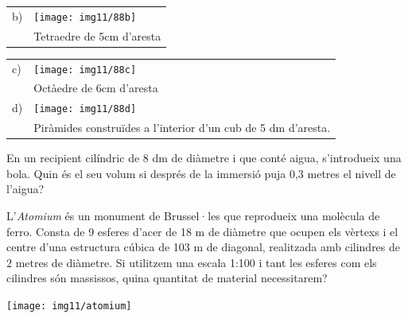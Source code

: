 \begin{activitats}
\begin{mylist}
\begin{center}
\begin{tabular}{p{1cm}p{4cm}}
		b) & \texttt{[image: img11/88b]} \\ &  Tetraedre de 5cm d'aresta \\
	\end{tabular}
\end{center}		
	
\begin{center}
	\scriptsize	
		\begin{tabular}{p{1cm}p{4cm}}	
		
		c) &  \texttt{[image: img11/88c]} \\ & Octàedre de 6cm d'aresta \\
		
		
		d) &  \texttt{[image: img11/88d]} \\ & Piràmides construïdes a l'interior d'un cub de 5 dm d'aresta. \\
	\end{tabular}
\end{center}

\answers[cols=1]{[$A=274.45$ cm$^2$; $V=326.6$ cm$^3$,  
				$A=162.06$ cm$^2$; $V=116.64$ cm$^3$, 
				$A=124.71$ cm$^2$; $V=101.82$ cm$^3$, 
				$A=59.15$ dm$^2$; $V=41.6$ dm$^3$]}

\exer  En un recipient cilíndric de 8 dm de diàmetre i que conté aigua, s'introdueix una bola. Quin és el seu volum si després de la immersió puja 0,3 metres el nivell de l'aigua?


\exer  L'\textit{Atomium} és un monument de Brussel·les que reprodueix una molècula de ferro. Consta de 9 esferes d'acer de 18 m de diàmetre que ocupen els vèrtexs i el centre d'una estructura cúbica de 103 m de diagonal, realitzada amb cilindres de 2 metres de diàmetre. Si utilitzem una escala 1:100 i tant les esferes com els cilindres són massissos, quina quantitat de material necessitarem? 
\begin{center}
	\texttt{[image: img11/atomium]}
\end{center}




\end{mylist}
\end{activitats}
